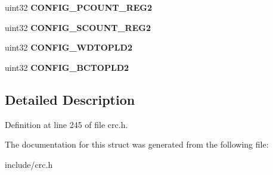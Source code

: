 \begin{DoxyCompactItemize}
\item 
\mbox{\label{structcrc__config__reg_a23b93a49eff24bcb12de87598c705551}} 
uint32 {\bfseries C\+O\+N\+F\+I\+G\+\_\+\+P\+C\+O\+U\+N\+T\+\_\+\+R\+E\+G2}
\item 
\mbox{\label{structcrc__config__reg_ab046bf6efd355f5a8e04f13f12c48762}} 
uint32 {\bfseries C\+O\+N\+F\+I\+G\+\_\+\+S\+C\+O\+U\+N\+T\+\_\+\+R\+E\+G2}
\item 
\mbox{\label{structcrc__config__reg_a45cc93574344d45052f592aa60d64778}} 
uint32 {\bfseries C\+O\+N\+F\+I\+G\+\_\+\+W\+D\+T\+O\+P\+L\+D2}
\item 
\mbox{\label{structcrc__config__reg_aca69cd87077b9591e2b6309e75f2edde}} 
uint32 {\bfseries C\+O\+N\+F\+I\+G\+\_\+\+B\+C\+T\+O\+P\+L\+D2}
\end{DoxyCompactItemize}


\subsection{Detailed Description}


Definition at line 245 of file crc.\+h.



The documentation for this struct was generated from the following file\+:\begin{DoxyCompactItemize}
\item 
include/crc.\+h\end{DoxyCompactItemize}

